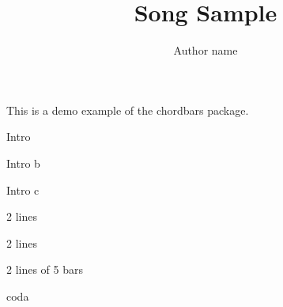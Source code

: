 \documentclass[11pt]{article}
\title{Song Sample}
\author{Author name}
\begin{document}
\songtitle
{}
\bpbthree

This is a demo example of the chordbars package.


\begin{chordbar}{4}{1}{Intro}
\repeatchord
\end{chordbar}
\begin{chordbar}{4}{3}{Intro b}
\repeatchord
{}
\end{chordbar}

\begin{chordbar}{4}{1}{Intro c}
\repeatchord
\repeatchord
\end{chordbar}




\begin{chordbarl}{12}{4}{2}{2 lines}
\repeatchord
\repeatchord
\end{chordbarl}

\begin{chordbarl}{11}{4}{3}{2 lines}
\newchordline
{}
\repeatchord
\end{chordbarl}

\begin{chordbarl}{10}{5}{2}{2 lines of 5 bars}
\newchordline
{}
\repeatchord
\end{chordbarl}

\begin{chordbar}{4}{1}{coda}
\end{chordbar}

\printNbBars
\end{document}
